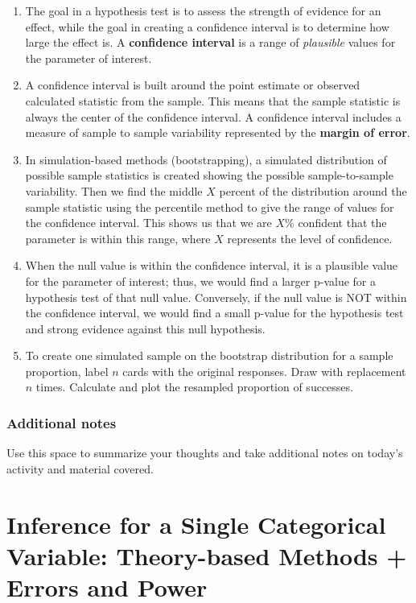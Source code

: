 \documentclass[
]{report}
\begin{document}
\begin{enumerate}
\def\labelenumi{\arabic{enumi}.}
\item
  The goal in a hypothesis test is to assess the strength of evidence for an effect, while the goal in creating a confidence interval is to determine how large the effect is. A \textbf{confidence interval} is a range of \emph{plausible} values for the parameter of interest.
\item
  A confidence interval is built around the point estimate or observed calculated statistic from the sample. This means that the sample statistic is always the center of the confidence interval. A confidence interval includes a measure of sample to sample variability represented by the \textbf{margin of error}.
\item
  In simulation-based methods (bootstrapping), a simulated distribution of possible sample statistics is created showing the possible sample-to-sample variability. Then we find the middle \(X\) percent of the distribution around the sample statistic using the percentile method to give the range of values for the confidence interval. This shows us that we are \(X\)\% confident that the parameter is within this range, where \(X\) represents the level of confidence.
\item
  When the null value is within the confidence interval, it is a plausible value for the parameter of interest; thus, we would find a larger p-value for a hypothesis test of that null value. Conversely, if the null value is NOT within the confidence interval, we would find a small p-value for the hypothesis test and strong evidence against this null hypothesis.
\item
  To create one simulated sample on the bootstrap distribution for a sample proportion, label \(n\) cards with the original responses. Draw with replacement \(n\) times. Calculate and plot the resampled proportion of successes.
\end{enumerate}

\hypertarget{additional-notes-9}{%
\subsection{Additional notes}\label{additional-notes-9}}

Use this space to summarize your thoughts and take additional notes on today's activity and material covered.

\newpage

\hypertarget{inference-for-a-single-categorical-variable-theory-based-methods-errors-and-power}{%
\chapter{Inference for a Single Categorical Variable: Theory-based Methods + Errors and Power}\label{inference-for-a-single-categorical-variable-theory-based-methods-errors-and-power}}
\end{document}
